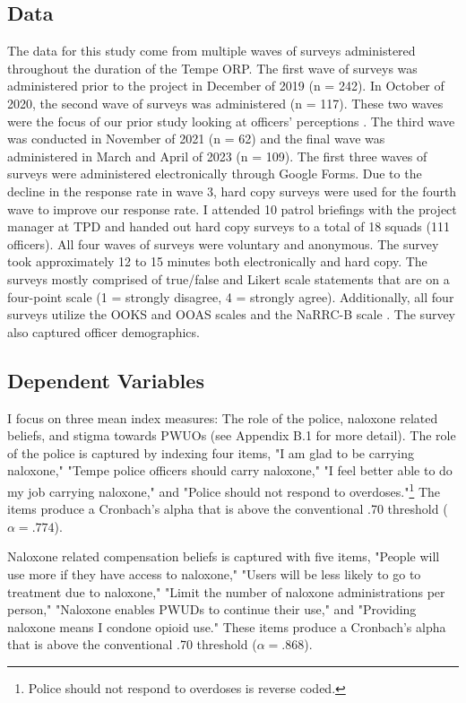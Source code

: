 \subsection{Data}

The data for this study come from multiple waves of surveys administered throughout the duration of the Tempe ORP. The first wave of surveys was administered prior to the project in December of 2019 (n = 242). In October of 2020, the second wave of surveys was administered (n = 117). These two waves were the focus of our prior study looking at officers’ perceptions \parencite{white_narcan_2021}. The third wave was conducted in November of 2021 (n = 62) and the final wave was administered in March and April of 2023 (n = 109). The first three waves of surveys were administered electronically through Google Forms. Due to the decline in the response rate in wave 3, hard copy surveys were used for the fourth wave to improve our response rate.  I attended 10 patrol briefings with the project manager at TPD and handed out hard copy surveys to a total of 18 squads (111 officers). All four waves of surveys were voluntary and anonymous. The survey took approximately 12 to 15 minutes both electronically and hard copy. The surveys mostly comprised of true/false and Likert scale statements that are on a four-point scale (1 = strongly disagree, 4 = strongly agree). Additionally, all four surveys utilize the OOKS and OOAS scales \parencite{williams_development_2013} and the NaRRC-B scale \parencite{winograd_concerns_2019}. The survey also captured officer demographics.

\subsection{Dependent Variables}

I focus on three mean index measures: The role of the police,  naloxone related beliefs, and stigma towards PWUOs (see Appendix B.1 for more detail). The role of the police is captured by indexing four items, "I am glad to be carrying naloxone," "Tempe police officers should carry naloxone," "I feel better able to do my job carrying naloxone," and "Police should not respond to overdoses."\footnote{Police should not respond to overdoses is reverse coded.} The items produce a Cronbach's alpha that is above the conventional .70 threshold (\(\alpha = .774\)).

Naloxone related compensation beliefs is captured with five items, "People will use more if they have access to naloxone," "Users will be less likely to go to treatment due to naloxone," "Limit the number of naloxone administrations per person," "Naloxone enables PWUDs to continue their use," and "Providing naloxone means I condone opioid use." These items produce a Cronbach's alpha that is above the conventional .70 threshold (\(\alpha = .868\)).

